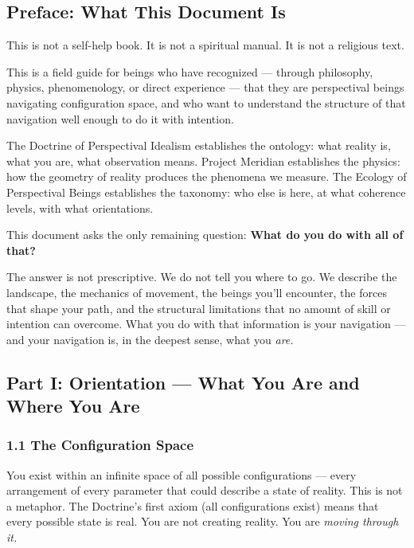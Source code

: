 \subsection*{Preface: What This Document Is}


This is not a self-help book. It is not a spiritual manual. It is not a religious text.


This is a field guide for beings who have recognized — through philosophy, physics, phenomenology, or direct experience — that they are perspectival beings navigating configuration space, and who want to understand the structure of that navigation well enough to do it with intention.


The Doctrine of Perspectival Idealism establishes the ontology: what reality is, what you are, what observation means. Project Meridian establishes the physics: how the geometry of reality produces the phenomena we measure. The Ecology of Perspectival Beings establishes the taxonomy: who else is here, at what coherence levels, with what orientations.


This document asks the only remaining question: \textbf{What do you do with all of that?}


The answer is not prescriptive. We do not tell you where to go. We describe the landscape, the mechanics of movement, the beings you'll encounter, the forces that shape your path, and the structural limitations that no amount of skill or intention can overcome. What you do with that information is your navigation — and your navigation is, in the deepest sense, what you \textit{are.}


\bigskip\noindent\makebox[\textwidth]{\color{rulegray}\rule{5cm}{0.3pt}}\bigskip


\subsection*{Part I: Orientation — What You Are and Where You Are}


\subsubsection*{1.1 The Configuration Space}


You exist within an infinite space of all possible configurations — every arrangement of every parameter that could describe a state of reality. This is not a metaphor. The Doctrine's first axiom (all configurations exist) means that every possible state is real. You are not creating reality. You are \textit{moving through it.}


